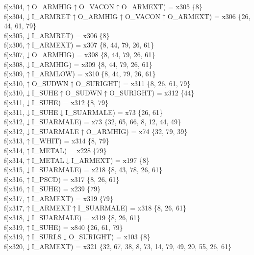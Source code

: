 f(x304,$\uparrow$O\_ARMHIG$\uparrow$O\_VACON$\uparrow$O\_ARMEXT) = x305 \{8\} \\  
f(x304,$\downarrow$I\_ARMRET$\uparrow$O\_ARMHIG$\uparrow$O\_VACON$\uparrow$O\_ARMEXT) = x306 \{26, 44, 61, 79\} \\  
f(x305,$\downarrow$I\_ARMRET) = x306 \{8\} \\  
f(x306,$\uparrow$I\_ARMEXT) = x307 \{8, 44, 79, 26, 61\} \\  
f(x307,$\downarrow$O\_ARMHIG) = x308 \{8, 44, 79, 26, 61\} \\  
f(x308,$\downarrow$I\_ARMHIG) = x309 \{8, 44, 79, 26, 61\} \\  
f(x309,$\uparrow$I\_ARMLOW) = x310 \{8, 44, 79, 26, 61\} \\  
f(x310,$\uparrow$O\_SUDWN$\uparrow$O\_SURIGHT) = x311 \{8, 26, 61, 79\} \\  
f(x310,$\downarrow$I\_SUHE$\uparrow$O\_SUDWN$\uparrow$O\_SURIGHT) = x312 \{44\} \\  
f(x311,$\downarrow$I\_SUHE) = x312 \{8, 79\} \\  
f(x311,$\downarrow$I\_SUHE$\downarrow$I\_SUARMALE) = x73 \{26, 61\} \\  
f(x312,$\downarrow$I\_SUARMALE) = x73 \{32, 65, 66, 8, 12, 44, 49\} \\  
f(x312,$\downarrow$I\_SUARMALE$\uparrow$O\_ARMHIG) = x74 \{32, 79, 39\} \\  
f(x313,$\uparrow$I\_WHIT) = x314 \{8, 79\} \\  
f(x314,$\uparrow$I\_METAL) = x228 \{79\} \\  
f(x314,$\uparrow$I\_METAL$\downarrow$I\_ARMEXT) = x197 \{8\} \\  
f(x315,$\downarrow$I\_SUARMALE) = x218 \{8, 43, 78, 26, 61\} \\  
f(x316,$\uparrow$I\_PSCD) = x317 \{8, 26, 61\} \\  
f(x316,$\uparrow$I\_SUHE) = x239 \{79\} \\  
f(x317,$\uparrow$I\_ARMEXT) = x319 \{79\} \\  
f(x317,$\uparrow$I\_ARMEXT$\uparrow$I\_SUARMALE) = x318 \{8, 26, 61\} \\  
f(x318,$\downarrow$I\_SUARMALE) = x319 \{8, 26, 61\} \\  
f(x319,$\uparrow$I\_SUHE) = x840 \{26, 61, 79\} \\  
f(x319,$\uparrow$I\_SURLS$\downarrow$O\_SURIGHT) = x103 \{8\} \\  
f(x320,$\downarrow$I\_ARMEXT) = x321 \{32, 67, 38, 8, 73, 14, 79, 49, 20, 55, 26, 61\} \\  
